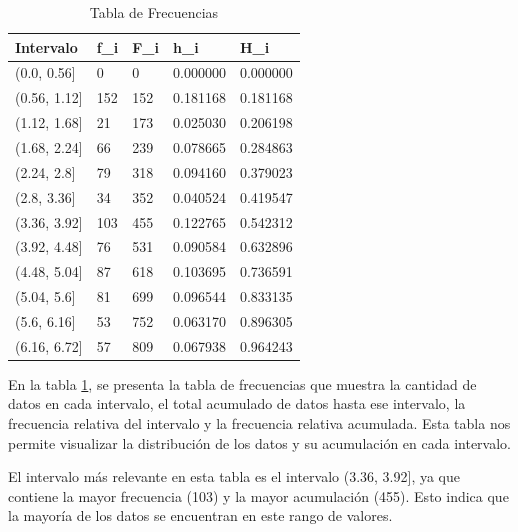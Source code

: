 \begin{table}[H]
    \centering
    \caption{Tabla de Frecuencias}
    \begin{tabular}{lllll}
        \hline
        \textbf{Intervalo} & \textbf{f\_i} & \textbf{F\_i} & \textbf{h\_i} & \textbf{H\_i} \\
        \hline
        (0.0, 0.56]        & 0             & 0             & 0.000000      & 0.000000      \\
        (0.56, 1.12]       & 152           & 152           & 0.181168      & 0.181168      \\
        (1.12, 1.68]       & 21            & 173           & 0.025030      & 0.206198      \\
        (1.68, 2.24]       & 66            & 239           & 0.078665      & 0.284863      \\
        (2.24, 2.8]        & 79            & 318           & 0.094160      & 0.379023      \\
        (2.8, 3.36]        & 34            & 352           & 0.040524      & 0.419547      \\
        (3.36, 3.92]       & 103           & 455           & 0.122765      & 0.542312      \\
        (3.92, 4.48]       & 76            & 531           & 0.090584      & 0.632896      \\
        (4.48, 5.04]       & 87            & 618           & 0.103695      & 0.736591      \\
        (5.04, 5.6]        & 81            & 699           & 0.096544      & 0.833135      \\
        (5.6, 6.16]        & 53            & 752           & 0.063170      & 0.896305      \\
        (6.16, 6.72]       & 57            & 809           & 0.067938      & 0.964243      \\
        \hline
    \end{tabular}%
    \label{tab:tabla_frecuencias}%
\end{table}%

En la tabla \ref{tab:tabla_frecuencias}, se presenta la tabla de frecuencias que muestra la cantidad de datos en cada intervalo, el total acumulado de datos hasta ese intervalo, la frecuencia relativa del intervalo y la frecuencia
relativa acumulada. Esta tabla nos permite visualizar la distribución de los datos y su acumulación en cada intervalo.

El intervalo más relevante en esta tabla es el intervalo (3.36, 3.92], ya que contiene la mayor frecuencia (103) y la mayor acumulación (455). Esto indica que la mayoría de los datos se encuentran en este rango de valores.

